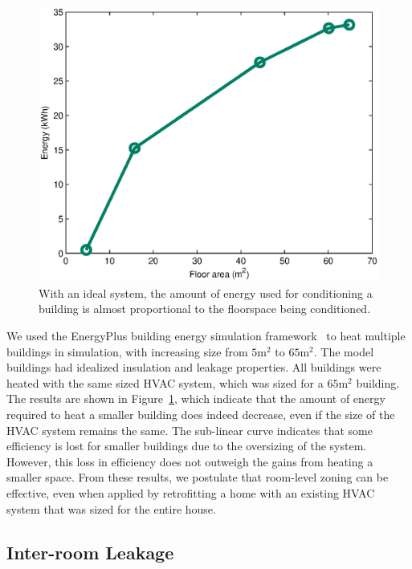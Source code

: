 \begin{figure}[t]
  \centering
  \includegraphics[width=0.6\columnwidth]{fig/areaVsEnergy}
  \caption[Effect of Floorspace on Energy Usage]{With an ideal system, the
    amount of energy used for conditioning a building is almost proportional to
    the floorspace being conditioned.}
  \label{fig:areaVsEnergy}
\end{figure}

We used the EnergyPlus building energy simulation
framework~\cite{crawley2004energyplus} to heat multiple buildings in simulation,
with increasing size from $5 \mathrm{m}^2$ to $65 \mathrm{m}^2$. The model
buildings had idealized insulation and leakage properties. All buildings were
heated with the same sized HVAC system, which was sized for a $65 \mathrm{m}^2$
building.  The results are shown in Figure~\ref{fig:areaVsEnergy}, which
indicate that the amount of energy required to heat a smaller building does
indeed decrease, even if the size of the HVAC system remains the same.  The
sub-linear curve indicates that some efficiency is lost for smaller buildings
due to the oversizing of the system.  However, this loss in efficiency does not
outweigh the gains from heating a smaller space.  From these results, we
postulate that room-level zoning can be effective, even when applied by
retrofitting a home with an existing HVAC system that was sized for the entire
house.


\subsection{Inter-room Leakage}
\label{subsec:interRoomLeakage}

